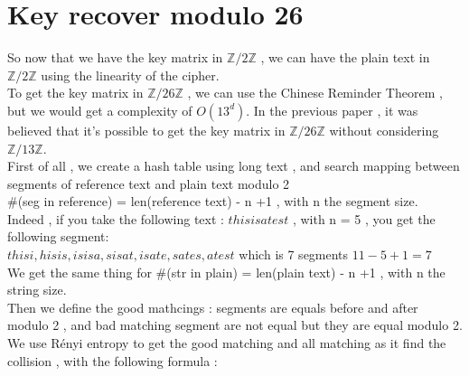 \documentclass{article}
\begin{document}
\section{Key recover modulo 26}
So now that we have the key matrix in $\mathbb{Z}/2\mathbb{Z}$ , we can have the plain text in $\mathbb{Z}/2\mathbb{Z}$ using the linearity of the cipher.\\
To get the key matrix in $\mathbb{Z}/26\mathbb{Z}$ , we can use the Chinese Reminder Theorem , but we would get a complexity of $O(13^d)$. In the previous paper , it was believed that it's possible to get the key matrix in $\mathbb{Z}/26\mathbb{Z}$ without considering $\mathbb{Z}/13\mathbb{Z}$.\\
First of all , we create a hash table using long text , and search mapping between segments of reference text and plain text modulo 2\\
\#(seg in reference) = len(reference text) - n +1 , with n the segment size.\\
Indeed , if you take the following text : $thisisatest$ , with n = 5 , you get the following segment:\\
 $ thisi , hisis , isisa , sisat , isate , sates , atest $ which is 7 segments $ 11 - 5 + 1 = 7 $\\
We get the same thing for \#(str in plain) = len(plain text) - n +1 , with n the string size.\\
Then we define the good mathcings : segments are equals before and after modulo 2 , and bad matching segment are not equal but they are equal modulo 2.\\
We use Rényi entropy to get the good matching and all matching as it find the collision , with the following formula :\\
\end{document}
